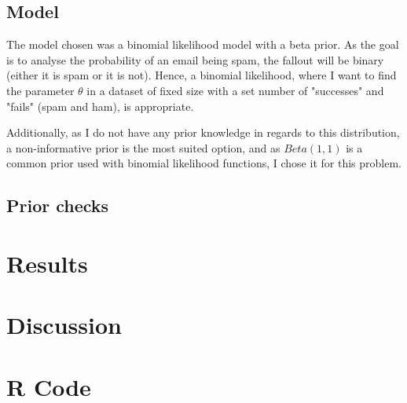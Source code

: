 \documentclass[12pt,a4paper,twoside]{article}
\begin{document}
\subsection{Model}
\label{ssec:model}
The model chosen was a binomial likelihood model with a beta prior. As the goal is to analyse the
probability of an email being spam, the fallout will be binary (either it is spam or it is not). Hence,
a binomial likelihood, where I want to find the parameter $\theta$ in a dataset of fixed size with a set
number of "successes" and "fails" (spam and ham), is appropriate.

Additionally, as I do not have any prior knowledge in regards to this distribution, a non-informative prior
is the most suited option, and as $Beta(1,1)$ is a common prior used with binomial likelihood functions, I
chose it for this problem.

\subsection{Prior checks}
\label{ssec:priorchecks}

\section{Results}

\section{Discussion}

\appendix
\section{R Code}

\end{document}
